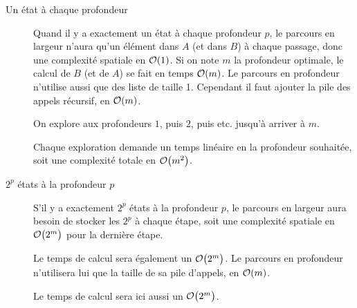 \begin{Exercise} 
\begin{description}
\item[Un état à chaque profondeur] 

Quand il y a exactement un état à chaque profondeur $p$, le
parcours en largeur n'aura qu'un élément dans $A$ (et dans $B$) à chaque
passage, donc une complexité spatiale en ${\cal O}(1)$. Si on note $m$ la
profondeur optimale, le calcul de $B$ (et de $A$) se fait en temps
${\cal O}(m)$. 
\smallskip
Le parcours en profondeur n'utilise aussi que des liste de taille 1. Cependant il faut ajouter la pile des appels récursif, en ${\cal O}(m)$. 

On explore aux profondeurs $1$, puis $2$, puis etc. jusqu'à arriver à $m$. 

Chaque exploration demande un temps linéaire en la profondeur souhaitée, soit
une complexité totale en ${\cal O}\bigl(m^2\bigr)$.
\medskip
\item[$2^p$ états à la profondeur $p$]

S'il y a exactement $2^p$ états à la profondeur $p$, le parcours
en largeur aura besoin de stocker les $2^p$ à chaque étape, soit une complexité spatiale en
${\cal O}\bigl(2^m\bigr)$ pour la dernière étape. 

Le temps de calcul sera également un ${\cal O}\bigl(2^m\bigr)$.
\smallskip
Le parcours en profondeur n'utilisera lui que la taille de sa pile d'appels, en ${\cal O}(m)$. 

Le temps de calcul sera ici aussi un ${\cal O}\bigl(2^m\bigr)$.
\end{description}
\end{Exercise}
